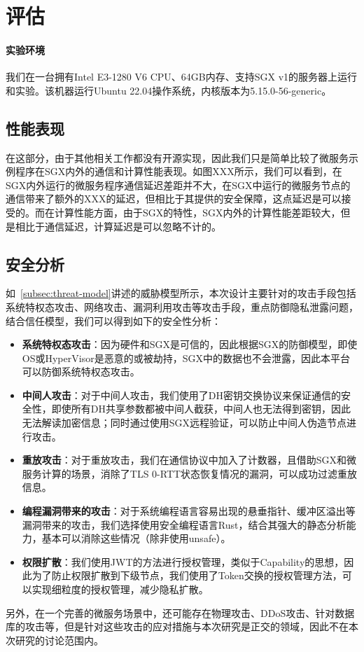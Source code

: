\section{评估}\label{sec:evaluation}

\paragraph{实验环境}

我们在一台拥有Intel E3-1280 V6 CPU、64GB内存、支持SGX v1的服务器上运行和实验。该机器运行Ubuntu 22.04操作系统，内核版本为5.15.0-56-generic。

\subsection{性能表现}

在这部分，由于其他相关工作都没有开源实现，因此我们只是简单比较了微服务示例程序在SGX内外的通信和计算性能表现。如图XXX所示，我们可以看到，在SGX内外运行的微服务程序通信延迟差距并不大，在SGX中运行的微服务节点的通信带来了额外的XXX的延迟，但相比于其提供的安全保障，这点延迟是可以接受的。而在计算性能方面，由于SGX的特性，SGX内外的计算性能差距较大，但是相比于通信延迟，计算延迟是可以忽略不计的。


\subsection{安全分析}

如~\ref{subsec:threat-model}讲述的威胁模型所示，本次设计主要针对的攻击手段包括系统特权态攻击、网络攻击、漏洞利用攻击等攻击手段，重点防御隐私泄露问题，结合信任模型，我们可以得到如下的安全性分析：

\begin{itemize}
    \item \textbf{系统特权态攻击}：因为硬件和SGX是可信的，因此根据SGX的防御模型，即使OS或HyperVisor是恶意的或被劫持，SGX中的数据也不会泄露，因此本平台可以防御系统特权态攻击。
    \item \textbf{中间人攻击}：对于中间人攻击，我们使用了DH密钥交换协议来保证通信的安全性，即使所有DH共享参数都被中间人截获，中间人也无法得到密钥，因此无法解读加密信息；同时通过使用SGX远程验证，可以防止中间人伪造节点进行攻击。
    \item \textbf{重放攻击}：对于重放攻击，我们在通信协议中加入了计数器，且借助SGX和微服务计算的场景，消除了TLS 0-RTT状态恢复情况的漏洞，可以成功过滤重放信息。
    \item \textbf{编程漏洞带来的攻击}：对于系统编程语言容易出现的悬垂指针、缓冲区溢出等漏洞带来的攻击，我们选择使用安全编程语言Rust，结合其强大的静态分析能力，基本可以消除这些情况（除非使用unsafe）。
    \item \textbf{权限扩散}：我们使用JWT的方法进行授权管理，类似于Capability的思想，因此为了防止权限扩散到下级节点，我们使用了Token交换的授权管理方法，可以实现细粒度的授权管理，减少隐私扩散。
\end{itemize}

另外，在一个完善的微服务场景中，还可能存在物理攻击、DDoS攻击、针对数据库的攻击等，但是针对这些攻击的应对措施与本次研究是正交的领域，因此不在本次研究的讨论范围内。
